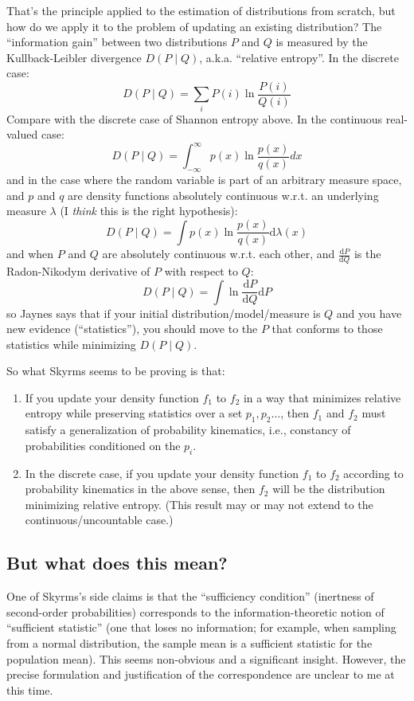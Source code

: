 \documentclass[letterpaper,12pt]{article}
\begin{document}
That's the principle applied to the estimation of distributions from scratch, but how do we apply it to the problem of updating an existing distribution? The ``information gain'' between two distributions $P$ and $Q$ is measured by the Kullback-Leibler divergence $D(P \mid Q)$, a.k.a. ``relative entropy''. In the discrete case:
$$D(P\mid Q) = \sum_i P(i) \ln \frac{P(i)}{Q(i)}$$
Compare with the discrete case of Shannon entropy above. In the continuous real-valued case:
$$D(P\mid Q) = \int_{-\infty}^\infty p(x) \ln \frac{p(x)}{q(x)} dx$$
and in the case where the random variable is part of an arbitrary measure space, and $p$ and $q$ are density functions absolutely continuous w.r.t. an underlying measure $\lambda$ (I \emph{think} this is the right hypothesis):
$$D(P\mid Q) = \int p(x) \ln \frac{p(x)}{q(x)} \mathrm{d}\lambda(x)$$
and when $P$ and $Q$ are absolutely continuous w.r.t. each other, and $\frac{\mathrm{d}P}{\mathrm{d}Q}$ is the Radon-Nikodym derivative of $P$ with respect to $Q$:
$$D(P \mid Q) = \int \ln \frac{\mathrm{d}P}{\mathrm{d}Q} \mathrm{d}P$$
so Jaynes says that if your initial distribution/model/measure is $Q$ and you have new evidence (``statistics''), you should move to the $P$ that conforms to those statistics while minimizing $D(P\mid Q)$. 

So what Skyrms seems to be proving is that:
\begin{enumerate}
\item
If you update your density function $f_1$ to $f_2$ in a way that minimizes relative entropy while preserving statistics over a set $p_1, p_2 \ldots$, then $f_1$ and $f_2$ must satisfy a generalization of probability kinematics, i.e., constancy of probabilities conditioned on the $p_i$.
\item
In the discrete case, if you update your density function $f_1$ to $f_2$ according to probability kinematics in the above sense, then $f_2$ will be the distribution minimizing relative entropy. (This result may or may not extend to the continuous/uncountable case.)
\end{enumerate}

\subsection{But what does this mean?}
One of Skyrms's side claims is that the ``sufficiency condition'' (inertness of second-order probabilities) corresponds to the information-theoretic notion of ``sufficient statistic'' (one that loses no information; for example, when sampling from a normal distribution, the sample mean is a sufficient statistic for the population mean). This seems non-obvious and a significant insight. However, the precise formulation and justification of the correspondence are unclear to me at this time.
\end{document}
